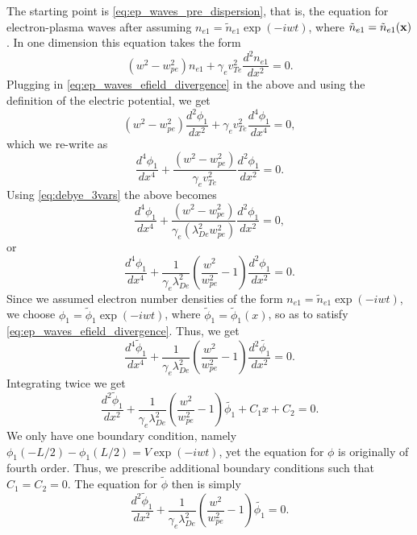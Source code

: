 \documentclass[a4paper,11pt]{report}
\begin{document}
The starting point is \cref{eq:ep_waves_pre_dispersion}, that is, the equation for electron-plasma waves after assuming $n_{e1} = \tilde{n}_{e1} \exp (-i w t)$, where $\tilde{n}_{e1} = \tilde{n}_{e1}(\mathbf{x})$. In one dimension this equation takes the form
\begin{equation*}
    \left ( w^2 - w_{pe}^2 \right ) n_{e1} + \gamma_e v_{Te}^2 \frac{d^2 n_{e1}}{dx^2} = 0.
\end{equation*}
Plugging in \cref{eq:ep_waves_efield_divergence} in the above and using the definition of the electric potential, we get
\begin{equation*}
    (w^2 - w_{pe}^2) \frac{d^2 \phi_1}{dx^2} + \gamma_e v_{Te}^2 \frac{d^4 \phi_1}{dx^4} = 0,
\end{equation*}
which we re-write as
\begin{equation*}
    \frac{d^4 \phi_1}{dx^4} + \frac{(w^2 - w_{pe}^2)}{\gamma_e v_{Te}^2} \frac{d^2 \phi_1}{dx^2} = 0.
\end{equation*}
Using \cref{eq:debye_3vars} the above becomes
\begin{equation*}
    \frac{d^4 \phi_1}{dx^4} + \frac{(w^2 - w_{pe}^2)}{\gamma_e (\lambda^2_{De} w^2_{pe}) } \frac{d^2 \phi_1}{dx^2} = 0,
\end{equation*}
or
\begin{equation*}
    \frac{d^4 \phi_1}{dx^4} + \frac{1}{\gamma_e \lambda^2_{De}} \left( \frac{w^2}{w^2_{pe}} - 1 \right) \frac{d^2 \phi_1}{dx^2} = 0.
\end{equation*}
Since we assumed electron number densities of the form $n_{e1} = \tilde{n}_{e1} \exp (-i w t)$, we choose $\phi_1 = \tilde{\phi}_1 \exp(-iwt)$, where $\tilde{\phi}_1 = \tilde{\phi}_1(x)$, so as to satisfy \cref{eq:ep_waves_efield_divergence}. Thus, we get
\begin{equation*}
    \frac{d^4 \tilde{\phi}_1}{dx^4} + \frac{1}{\gamma_e \lambda^2_{De}} \left( \frac{w^2}{w^2_{pe}} - 1 \right) \frac{d^2 \tilde{\phi_1}}{dx^2} = 0.
\end{equation*}
Integrating twice we get 
\begin{equation*}
    \frac{d^2 \tilde{\phi}_1}{dx^2} + \frac{1}{\gamma_e \lambda^2_{De}} \left( \frac{w^2}{w^2_{pe}} - 1 \right) \tilde{\phi_1} + C_1 x + C_2 = 0.
\end{equation*}
We only have one boundary condition, namely $\phi_1(-L/2) - \phi_1(L/2) = V \exp (-iwt)$, yet the equation for $\phi$ is originally of fourth order. Thus, we prescribe additional boundary conditions such that $C_1 = C_2 = 0$. The equation for $\tilde{\phi}$ then is simply
\begin{equation}
    \label{eq:params_pf_ode_general}
    \frac{d^2 \tilde{\phi}_1}{dx^2} + \frac{1}{\gamma_e \lambda^2_{De}} \left( \frac{w^2}{w^2_{pe}} - 1 \right) \tilde{\phi_1} = 0.
\end{equation}
\end{document}
